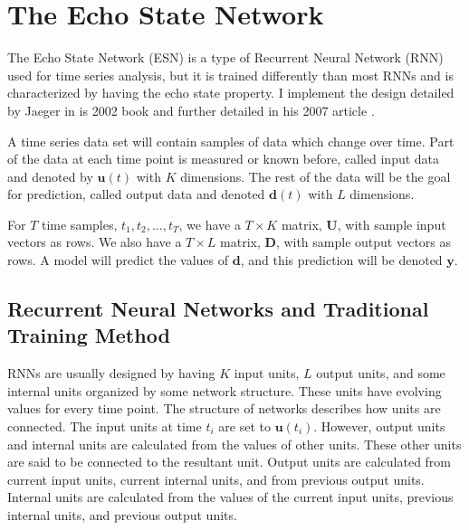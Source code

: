 \documentclass{article}
\begin{document}
\section{The Echo State Network}

\newcommand{\Tv}{\mathbf{T}}
\newcommand{\Uv}{\mathbf{U}}
\newcommand{\Dv}{\mathbf{D}}
\newcommand{\tv}{\mathbf{t}}
\newcommand{\uv}{\mathbf{u}}
\newcommand{\dv}{\mathbf{d}}
\newcommand{\yv}{\mathbf{y}}
\newcommand{\Fv}{\mathbf{F}}
\newcommand{\wv}{\mathbf{w}}

The Echo State Network (ESN) is a type of Recurrent Neural Network (RNN)
used for time series analysis, but it is trained differently than most
RNNs and is 
characterized by having the echo state property. I implement the design
detailed by Jaeger in is 2002 book \cite{jaeger2002tutorial} and
further detailed in his 2007 article \cite{jaeger2007echo}.

A time series data set will contain samples of data which change
over time. Part of the data at each time point is measured or known
before, called input data and denoted by $\uv(t)$ with $K$ dimensions.
The rest of the data will be the goal for prediction, called output data and denoted $\dv(t)$ with $L$ dimensions. 

For $T$ time samples, $t_1, t_2, \dots, t_T$, we have a $T \times K$ 
matrix, $\Uv$, with sample input vectors as rows. We also
have a $T \times L$ matrix,
$\Dv$, with sample output vectors as rows. A model will predict the 
values of $\dv$, and this prediction will be denoted $\yv$.

\subsection{Recurrent Neural Networks and Traditional Training Method}
\label{sec:rnn}
RNNs are usually designed by having $K$ input units, $L$ output units, 
and some internal units organized by some network structure. These units
have evolving values for every time point. The
structure of networks describes how units are connected. 
The input units at time $t_i$ are set to $\uv(t_i)$. However, output
units and
internal units are calculated from the values of other units. These other 
units are said to be connected to the resultant unit. Output
units are calculated from current input units, current internal units,
and from previous output units. Internal units 
are calculated from the values of the current input units, 
previous internal units, and previous output units.
\end{document}
